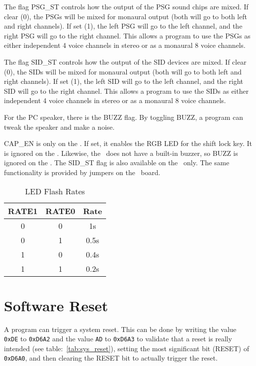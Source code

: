 The flag PSG\_ST controls how the output of the PSG sound chips are mixed. If clear (0), the PSGs will be mixed for monaural output (both will go to both left and right channels). If set (1), the left PSG will go to the left channel, and the right PSG will go to the right channel. This allows a program to use the PSGs as either independent 4 voice channels in stereo or as a monaural 8 voice channels.

The flag SID\_ST controls how the output of the SID devices are mixed. If clear (0), the SIDs will be mixed for monaural output (both will go to both left and right channels). If set (1), the left SID will go to the left channel, and the right SID will go to the right channel. This allows a program to use the SIDs as either independent 4 voice channels in stereo or as a monaural 8 voice channels.

For the PC speaker, there is the BUZZ flag. By toggling BUZZ, a program can tweak the speaker and make a noise.

\begin{note}
    CAP\_EN is only on the \fk. If set, it enables the RGB LED for the shift lock key. It is ignored on the \jr.
    Likewise, the \fk\ does not have a built-in buzzer, so BUZZ is ignored on the \fk. The SID\_ST flag is also available on the \fk\ only. The same functionality is provided by jumpers on the \fjr\ board.
\end{note}

\begin{table}[ht]
    \begin{center}
        \begin{tabular}{|c|c|c|} \hline
            RATE1 & RATE0 & Rate \\\hline\hline
            0 & 0 & 1s \\ \hline
            0 & 1 & 0.5s \\ \hline
            1 & 0 & 0.4s \\ \hline
            1 & 1 & 0.2s \\ \hline
        \end{tabular}
    \end{center}
    \caption{LED Flash Rates}
    \label{tab:led_rates}
\end{table}

\section*{Software Reset}

A program can trigger a system reset. This can be done by writing the value \verb+0xDE+ to \verb+0xD6A2+ and the value \verb+AD+ to \verb+0xD6A3+ to validate that a reset is really intended (see table:~\ref{tab:sys_reset}), setting the most significant bit (RESET) of \verb+0xD6A0+, and then clearing the RESET bit to actually trigger the reset.

